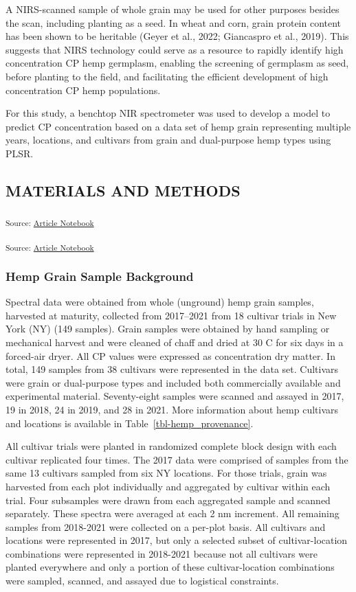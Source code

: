 \documentclass[
]{agujournal2019}
\begin{document}
A NIRS-scanned sample of whole grain may be used for other purposes
besides the scan, including planting as a seed. In wheat and corn, grain
protein content has been shown to be heritable (Geyer et al., 2022;
Giancaspro et al., 2019). This suggests that NIRS technology could serve
as a resource to rapidly identify high concentration CP hemp germplasm,
enabling the screening of germplasm as seed, before planting to the
field, and facilitating the efficient development of high concentration
CP hemp populations.

For this study, a benchtop NIR spectrometer was used to develop a model
to predict CP concentration based on a data set of hemp grain
representing multiple years, locations, and cultivars from grain and
dual-purpose hemp types using PLSR.

\subsection{MATERIALS AND METHODS}\label{materials-and-methods}

\textsubscript{Source:
\href{https://rvcrawford.github.io/glowing-system/index.qmd.html}{Article
Notebook}}

\textsubscript{Source:
\href{https://rvcrawford.github.io/glowing-system/index.qmd.html}{Article
Notebook}}

\subsubsection{Hemp Grain Sample
Background}\label{hemp-grain-sample-background}

Spectral data were obtained from whole (unground) hemp grain samples,
harvested at maturity, collected from 2017--2021 from 18 cultivar trials
in New York (NY) (149 samples). Grain samples were obtained by hand
sampling or mechanical harvest and were cleaned of chaff and dried at 30
C for six days in a forced-air dryer. All CP values were expressed as
concentration dry matter. In total, 149 samples from 38 cultivars were
represented in the data set. Cultivars were grain or dual-purpose types
and included both commercially available and experimental material.
Seventy-eight samples were scanned and assayed in 2017, 19 in 2018, 24
in 2019, and 28 in 2021. More information about hemp cultivars and
locations is available in Table~\ref{tbl-hemp_provenance}.

All cultivar trials were planted in randomized complete block design
with each cultivar replicated four times. The 2017 data were comprised
of samples from the same 13 cultivars sampled from six NY locations. For
those trials, grain was harvested from each plot individually and
aggregated by cultivar within each trial. Four subsamples were drawn
from each aggregated sample and scanned separately. These spectra were
averaged at each 2 nm increment. All remaining samples from 2018-2021
were collected on a per-plot basis. All cultivars and locations were
represented in 2017, but only a selected subset of cultivar-location
combinations were represented in 2018-2021 because not all cultivars
were planted everywhere and only a portion of these cultivar-location
combinations were sampled, scanned, and assayed due to logistical
constraints.
\end{document}
